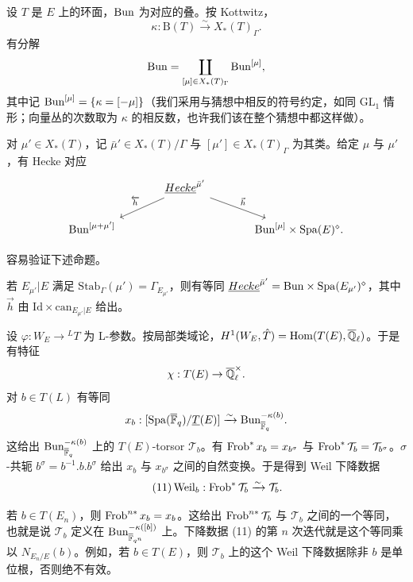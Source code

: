 设 $T$ 是 $E$ 上的环面，$\mathrm{Bun}$ 为对应的叠。按 Kottwitz，
\[
\kappa : \mathrm{B}(T) \xrightarrow{\sim} X_*(T)_\Gamma .
\]
有分解
\[
\mathrm{Bun} = \coprod_{[\mu] \in X_*(T)_\Gamma} \mathrm{Bun}^{[\mu]},
\]
其中记 $\mathrm{Bun}^{[\mu]} = \{\kappa = [-\mu]\}$（我们采用与猜想中相反的符号约定，如同 $\mathrm{GL}_1$ 情形；向量丛的次数取为 $\kappa$ 的相反数，也许我们该在整个猜想中都这样做）。

对 $\mu' \in X_*(T)$，记 $\bar\mu' \in X_*(T)/\Gamma$ 与 $[\mu'] \in X_*(T)_\Gamma$ 为其类。给定 $\mu$ 与 $\mu'$，有 Hecke 对应
\[
\begin{tikzcd}[column sep=large]
& \ul{Hecke}^{\bar\mu'} \arrow[dl, "\overleftarrow{h}"'] \arrow[dr, "\vec{h}"] & \\
\Bun^{[\mu+\mu']} & & \Bun^{[\mu]} \times \Spa(E)^\diamond .
\end{tikzcd}
\]

容易验证下述命题。

\begin{proposition}\label{prop:9.3}
若 $E_{\mu'}|E$ 满足 $\mathrm{Stab}_\Gamma(\mu') = \Gamma_{E_{\mu'}}$，则有等同 $\underline{Hecke}^{\bar\mu'} = \mathrm{Bun} \times \mathrm{Spa}(E_{\mu'})^\diamond$，其中 $\vec{h}$ 由 $\mathrm{Id} \times \mathrm{can}_{E_{\mu'}|E}$ 给出。
\end{proposition}

设 $\varphi : W_E \to {}^L T$ 为 L-参数。按局部类域论，$H^1(W_E, \hat{T}) = \operatorname{Hom}(T(E), \overline{\mathbb{Q}}_\ell)$。于是有特征
\[
\chi : T(E) \to \overline{\mathbb{Q}}_\ell^\times .
\]
对 $b \in T(L)$ 有等同
\[
x_b : [\mathrm{Spa}(\overline{\mathbb{F}}_q)/\underline{T}(E)] \xrightarrow{\sim} \mathrm{Bun}^{-\kappa(b)}_{\overline{\mathbb{F}}_q} .
\]
这给出 $\mathrm{Bun}^{-\kappa(b)}_{\overline{\mathbb{F}}_q}$ 上的 $T(E)$-torsor $\mathcal{T}_b$。有 $\operatorname{Frob}^* x_b = x_{b^\sigma}$ 与 $\operatorname{Frob}^* \mathcal{T}_b = \mathcal{T}_{b^\sigma}$。$\sigma$-共轭 $b^\sigma = b^{-1}.b.b^\sigma$ 给出 $x_b$ 与 $x_{b^\sigma}$ 之间的自然变换。于是得到 Weil 下降数据
\begin{equation}\tag{11}\label{eq:9.11}
\operatorname{Weil}_b : \operatorname{Frob}^* \mathcal{T}_b \xrightarrow{\sim} \mathcal{T}_b .
\end{equation}

\begin{example}\label{ex:9.4}
若 $b \in T(E_n)$，则 $\operatorname{Frob}^{n*} x_b = x_b$。这给出 $\operatorname{Frob}^{n*} \mathcal{T}_b$ 与 $\mathcal{T}_b$ 之间的一个等同，也就是说 $\mathcal{T}_b$ 定义在 $\mathrm{Bun}^{-\kappa([b])}_{\overline{\mathbb{F}}_{q^n}}$ 上。下降数据 (11) 的第 $n$ 次迭代就是这个等同乘以 $N_{E_n/E}(b)$。例如，若 $b \in T(E)$，则 $\mathcal{T}_b$ 上的这个 Weil 下降数据除非 $b$ 是单位根，否则绝不有效。
\end{example}


